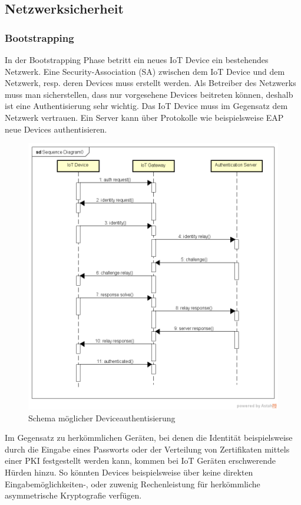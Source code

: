 \subsection{Netzwerksicherheit}
\subsubsection{Bootstrapping}
In der Bootstrapping Phase betritt ein neues IoT Device ein bestehendes Netzwerk. Eine Security-Association (SA) zwischen dem IoT Device und dem Netzwerk, resp. deren Devices muss erstellt werden. Als Betreiber des Netzwerks muss man sicherstellen, dass nur vorgesehene Devices beitreten können, deshalb ist eine Authentisierung sehr wichtig. Das IoT Device muss im Gegensatz dem Netzwerk vertrauen. Ein Server kann über Protokolle wie beispielsweise EAP neue Devices authentisieren.
\begin{figure}[H]
\centering
\includegraphics[scale=0.6]{../02_Analyse/images/deviceauthentication.png}
\caption{Schema möglicher Deviceauthentisierung}
\end{figure}
Im Gegensatz zu herkömmlichen Geräten, bei denen die Identität beispielsweise durch die Eingabe eines Passworts oder der Verteilung von Zertifikaten mittels einer PKI festgestellt werden kann, kommen bei IoT Geräten erschwerende Hürden hinzu. \cite{IoTSecurityChallenges} So könnten Devices beispielsweise über keine direkten Eingabemöglichkeiten-, oder zuwenig Rechenleistung für herkömmliche asymmetrische Kryptografie verfügen.


